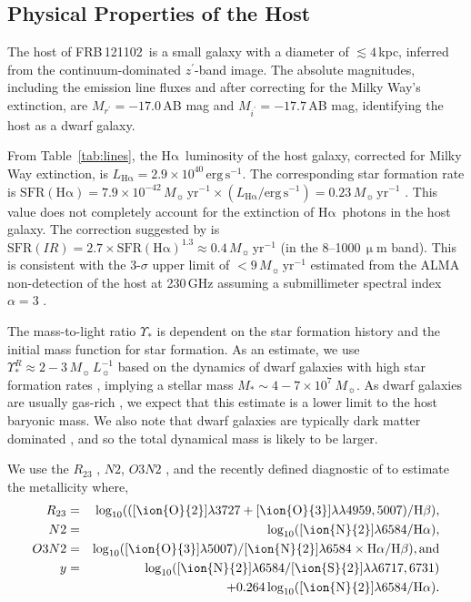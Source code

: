 \documentclass[twocolumn]{aastex61}
\def \frb {FRB\,121102}
\def \halpha {\ensuremath{\mathrm{H\alpha}}}
\def \hbeta {\ensuremath{\mathrm{H\beta}}}
\newcommand{\be}{\begin{eqnarray}}
\newcommand{\ee}{\end{eqnarray}}
\newcommand{\SFR}{\ensuremath{\mathrm{SFR}}}
\begin{document}
\subsection{Physical Properties of the Host}
The host of \frb\ is a small galaxy with a diameter of $\lesssim 4$\,kpc, inferred from the continuum-dominated $z^\prime$-band image. The absolute magnitudes, including the emission line fluxes and  after correcting for the Milky Way's extinction, are $M_{r^\prime} = -17.0$\,AB mag and $M_{i^\prime} = -17.7$\,AB mag, identifying the host as a dwarf galaxy. %

From Table~\ref{tab:lines}, the \halpha\ luminosity of the host galaxy, corrected for Milky Way extinction, is $L_\halpha = 2.9\times10^{40}\,\mathrm{erg\,s^{-1}}$. The corresponding star formation rate is $\SFR(\halpha) = 7.9\times10^{-42}\,M_\sun\,\mathrm{yr^{-1}}\times (L_\halpha/\mathrm{erg\,s^{-1}}) = 0.23\,M_\sun\,\mathrm{yr^{-1}}$ \citep{ktc1994}. This value does not completely account for the extinction of \halpha\ photons in the host galaxy. The correction suggested by \citet{kgjd2002} is $\SFR(IR) = 2.7\times \SFR(\halpha)^{1.3} \approx 0.4 \,M_\sun\,\mathrm{yr^{-1}}$ (in the 8--1000\,$\upmu$m band). This is consistent with the 3-$\sigma$ upper limit of $<9\,M_\sun\,\mathrm{yr^{-1}}$ estimated from the ALMA non-detection of the host at 230\,GHz assuming a submillimeter spectral index $\alpha=3$ \citep{clw+16}.

The mass-to-light ratio $\Upsilon_{*}$ is dependent on the star formation history and the initial mass function for star formation. As an estimate, we use $\Upsilon_{*}^R \approx 2-3\,M_\sun\,L_\sun^{-1}$ based on the dynamics of dwarf galaxies with high star formation rates \citep{lvf14}, implying a stellar mass $M_* \sim 4-7 \times 10^7\ M_\sun$. As dwarf galaxies are usually gas-rich \citep[e.g. ][]{pch+12}, we expect that this estimate is a lower limit to the host baryonic mass. We also note that dwarf galaxies are typically dark matter dominated \citep{ccf00}, and so the total dynamical mass is likely to be larger.

We use the $R_{23}$ \citep{kd02}, $N2$, $O3N2$ \citep{pp04}, and the recently defined diagnostic of \citet[][labelled here as $y$]{dksn16} to estimate the metallicity where,
\be
R_{23} &=& \log_{10}((\text{[\ion{O}{2}]}\lambda3727+\text{[\ion{O}{3}]}\lambda\lambda4959,5007)/\hbeta),\nonumber\\
N2 &=& \log_{10}(\text{[\ion{N}{2}]}\lambda6584/\halpha),\nonumber\\
O3N2 &=& \log_{10}(\text{[\ion{O}{3}]}\lambda5007)/\text{[\ion{N}{2}]}\lambda6584 \times \halpha/\hbeta), \text{and}\nonumber \\ 
y &=&  \log_{10}(\text{[\ion{N}{2}]}\lambda6584/\text{[\ion{S}{2}]}\lambda\lambda6717,6731) \nonumber\\
& &+0.264 \log_{10}(\text{[\ion{N}{2}]}\lambda6584/\halpha). \nonumber
\ee
\end{document}
